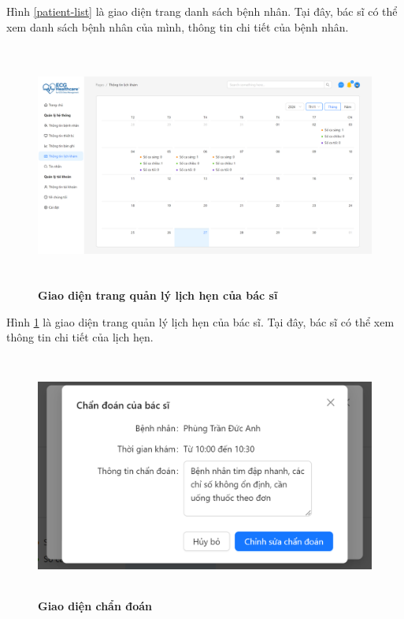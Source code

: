 Hình \ref{patient-list} là giao diện trang danh sách bệnh nhân. Tại đây, bác sĩ có thể xem danh sách bệnh nhân của mình, thông tin chi tiết của bệnh nhân.

\begin{figure}[H]
	\centering
	\includegraphics[width=15cm,height=8cm]{Images/doctor_ui/schedule.png}
	\caption[Giao diện trang quản lý lịch hẹn của bác sĩ]{\bfseries \fontsize{12pt}{0pt}\selectfont Giao diện trang quản lý lịch hẹn của bác sĩ}
	\label{schdule-doctor}
\end{figure}

Hình \ref{schdule-doctor} là giao diện trang quản lý lịch hẹn của bác sĩ. Tại đây, bác sĩ có thể xem thông tin chi tiết của lịch hẹn.

\begin{figure}[H]
	\centering
	\includegraphics[width=15cm,height=8cm]{Images/doctor_ui/diag.png}
	\caption[Giao diện chẩn đoán]{\bfseries \fontsize{12pt}{0pt}\selectfont Giao diện chẩn đoán}
	\label{diag}
\end{figure}

